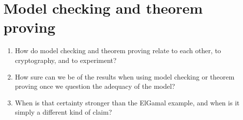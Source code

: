 \section{Model checking and theorem proving}

\begin{frame}
  \begin{question}
    \begin{enumerate}
      \item How do model checking and theorem proving relate to each other, 
        to cryptography, and to experiment?
      \item How sure can we be of the results when using model checking or 
        theorem proving once we question the adequacy of the model?
      \item When is that certainty stronger than the ElGamal example, and when 
        is it simply a different kind of claim?
    \end{enumerate}
  \end{question}
\end{frame}
